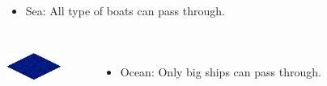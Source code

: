 \begin{frame}
\begin{columns}
		\begin{itemize}
			\item Sea: All type of boats can pass through.
		\end{itemize}
	\end{columns}
	
	\vspace{1em}
	
	\begin{columns}
		\centering \includegraphics[width=0.7\textwidth]{images/ocean.png}
		
		\begin{itemize}
			\item Ocean: Only big ships can pass through.
		\end{itemize}
	\end{columns}
\end{frame}